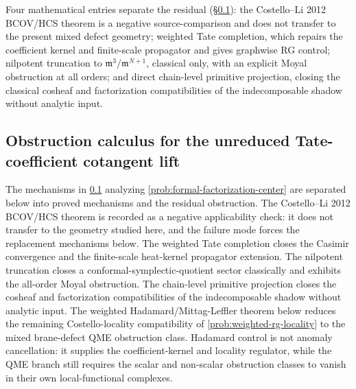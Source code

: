 \documentclass[11pt]{memoir}
\begin{document}
\begin{prob}
  Four mathematical entries separate the residual
  (\S\ref{ssec:tate-residual-resolution}): the Costello--Li 2012
  BCOV/HCS theorem is a negative source-comparison and does not transfer
  to the present mixed defect geometry; weighted
  Tate completion, which repairs the coefficient kernel and finite-scale
  propagator and gives graphwise RG control; nilpotent truncation to
  \(\mathfrak m^3/\mathfrak m^{N+1}\), classical only, with an explicit
  Moyal obstruction at all orders; and direct chain-level primitive
  projection, closing the classical cosheaf and factorization
  compatibilities of the indecomposable shadow without analytic input.
\end{prob}

\subsection{Obstruction calculus for the unreduced Tate-coefficient cotangent lift}\label{ssec:tate-residual-resolution}

The mechanisms in \ref{ssec:tate-residual-resolution} analyzing
\ref{prob:formal-factorization-center} are separated below into proved
mechanisms and the residual obstruction. The
  Costello--Li 2012 BCOV/HCS theorem is recorded as a negative applicability
  check: it does not transfer to the geometry studied here, and the
  failure mode forces the replacement mechanisms below. The weighted Tate completion
closes the Casimir convergence and the finite-scale heat-kernel
propagator extension.
The nilpotent truncation closes a conformal-symplectic-quotient sector
classically and exhibits the all-order Moyal obstruction. The chain-level primitive
  projection closes the cosheaf and factorization compatibilities of the
  indecomposable shadow without analytic input. The weighted Hadamard/Mittag-Leffler theorem below reduces the
remaining Costello-locality compatibility of
\ref{prob:weighted-rg-locality} to the mixed brane-defect QME obstruction
class.  Hadamard control is not anomaly cancellation: it supplies the
coefficient-kernel and locality regulator, while the QME branch still
requires the scalar and non-scalar obstruction classes to vanish in their
own local-functional complexes.








\end{document}
